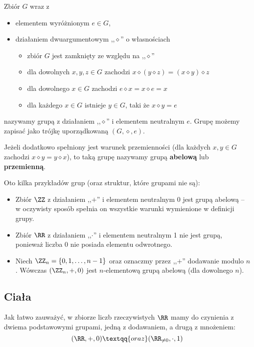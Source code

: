 Zbiór $G$ wraz z
\begin{itemize}
    \item elementem wyróżnionym $e\in G$,
    \item działaniem dwuargumentowym ,,$\diamond$'' o własnościach
    \begin{itemize}
        \item zbiór $G$ jest zamknięty ze względu na ,,$\diamond$''
        \item dla dowolnych $x, y, z \in G$ zachodzi $x \diamond (y \diamond z) = (x \diamond y) \diamond z$ 
        \item dla dowolnego $x \in G$ zachodzi $e \diamond x = x \diamond e = x$ 
        \item dla każdego $x \in G$ istnieje $y \in G$, taki że $x \diamond y = e$ 
    \end{itemize}
\end{itemize}
nazywamy grupą z działaniem ,,$\diamond$'' i elementem neutralnym $e$. Grupę możemy zapisać jako trójkę uporządkowaną $(G,\diamond,e)$.

Jeżeli dodatkowo spełniony jest warunek przemienności (dla każdych $x, y \in G$ zachodzi $x \diamond y = y \diamond x$), to taką grupę nazywamy grupą \textbf{abelową} lub \textbf{przemienną}.

\begin{example}
    Oto kilka przykładów grup (oraz struktur, które grupami nie są):
    \begin{itemize}
        \item Zbiór $\ZZ$ z działaniem ,,$+$'' i elementem neutralnym 0 jest grupą abelową -- w oczywisty sposób spełnia on wszystkie warunki wymienione w definicji grupy.
        \item Zbiór $\RR$ z działaniem ,,$\cdot$'' i elementem neutralnym 1 nie jest grupą, ponieważ liczba 0 nie posiada elementu odwrotnego.
        \item Niech $\ZZ_n=\{0,1,\ldots,n-1\}$ oraz oznaczmy przez ,,$+$'' dodawanie modulo $n$. Wówczas $(\ZZ_n,+,0)$ jest $n$-elementową grupą abelową (dla dowolnego $n$).
    \end{itemize}
\end{example}

\subsection{Ciała}

Jak łatwo zauważyć, w zbiorze liczb rzeczywistych $\RR$ mamy do czynienia z dwiema podstawowymi grupami, jedną z dodawaniem, a drugą z mnożeniem:
$$(\RR, +, 0) \textqq{oraz} (\RR_{\neq 0}, \cdot, 1)$$

